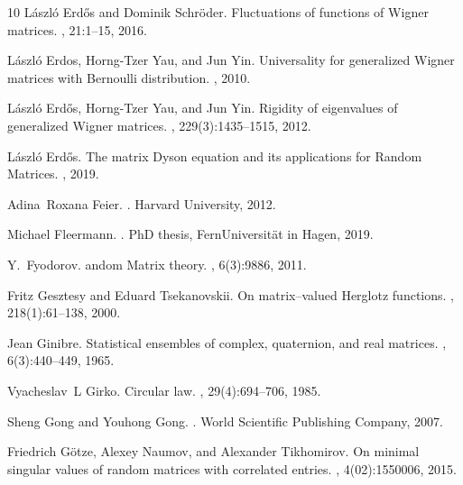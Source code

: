 \documentclass[11pt, a4paper, oneside]{book}
\numberwithin{equation}{chapter}
\begin{document}
\begin{thebibliography}{10}
L{\'a}szl{\'o} Erd{\H{o}}s and Dominik Schr{\"o}der.
\newblock Fluctuations of functions of {W}igner matrices.
, 21:1--15, 2016.

L{\'a}szl{\'o} Erdos, Horng-Tzer Yau, and Jun Yin.
\newblock Universality for generalized {W}igner matrices with {B}ernoulli distribution.
, 2010.

L{\'a}szl{\'o} Erd{\H{o}}s, Horng-Tzer Yau, and Jun Yin.
\newblock Rigidity of eigenvalues of generalized {W}igner matrices.
, 229(3):1435--1515, 2012.

L{\'a}szl{\'o} Erdős.
\newblock The matrix {D}yson equation and its applications for {R}andom {M}atrices.
, 2019.

Adina~Roxana Feier.
.
\newblock Harvard University, 2012.

Michael Fleermann.
.
\newblock PhD thesis, FernUniversit{\"a}t in Hagen, 2019.

Y.~Fyodorov.
andom {M}atrix theory.
, 6(3):9886, 2011.

Fritz Gesztesy and Eduard Tsekanovskii.
\newblock On matrix--valued {H}erglotz functions.
, 218(1):61--138, 2000.

Jean Ginibre.
\newblock Statistical ensembles of complex, quaternion, and real matrices.
, 6(3):440--449, 1965.

Vyacheslav~L Girko.
\newblock Circular law.
, 29(4):694--706, 1985.

Sheng Gong and Youhong Gong.
.
\newblock World Scientific Publishing Company, 2007.

Friedrich G{\"o}tze, Alexey Naumov, and Alexander Tikhomirov.
\newblock On minimal singular values of random matrices with correlated entries.
, 4(02):1550006, 2015.


\end{thebibliography}
\end{document}
